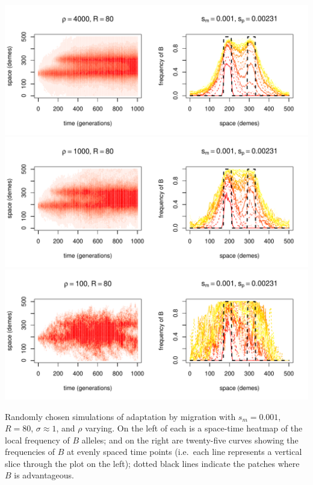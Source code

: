 \documentclass{article}
\begin{document}
\begin{sfigure}
  \begin{center}
    \includegraphics{example-migration-sims/88079-r1-501-sb0_01-sm-0_001-N4000-pophistory-run}
    \includegraphics{example-migration-sims/3464-r1-501-sb0_01-sm-0_001-N1000-pophistory-run}
    \includegraphics{example-migration-sims/37774-r1-501-sb0_01-sm-0_001-N100-pophistory-run}
  \end{center}
  \caption{
    Randomly chosen simulations of adaptation by migration
    with $s_m=0.001$, $R=80$, $\sigma\approx 1$, and $\rho$ varying.
    On the left of each is a space-time heatmap of the local frequency of $B$ alleles;
    and on the right are twenty-five curves showing the frequencies of $B$ at evenly spaced time points
    (i.e.\ each line represents a vertical slice through the plot on the left);
    dotted black lines indicate the patches where $B$ is advantageous.
  } \label{sfig:sims_7}
\end{sfigure}
\end{document}

